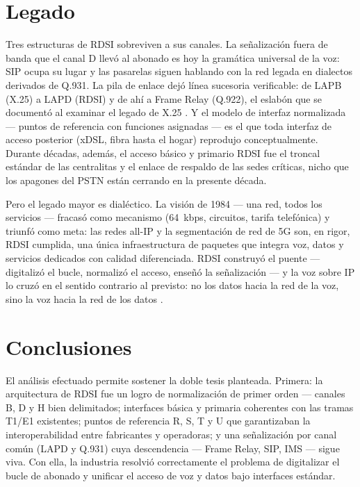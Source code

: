 \documentclass[12pt,a4paper]{article}
\begin{document}
\section{Legado}

Tres estructuras de RDSI sobreviven a sus canales. La señalización fuera de banda que el canal D llevó al abonado es hoy la gramática universal de la voz: SIP ocupa su lugar y las pasarelas siguen hablando con la red legada en dialectos derivados de Q.931. La pila de enlace dejó línea sucesoria verificable: de LAPB (X.25) a LAPD (RDSI) y de ahí a Frame Relay (Q.922), el eslabón que se documentó al examinar el legado de X.25 \cite{stallings2004, stallings1999}. Y el modelo de interfaz normalizada --- puntos de referencia con funciones asignadas --- es el que toda interfaz de acceso posterior (xDSL, fibra hasta el hogar) reprodujo conceptualmente. Durante décadas, además, el acceso básico y primario RDSI fue el troncal estándar de las centralitas y el enlace de respaldo de las sedes críticas, nicho que los apagones del PSTN están cerrando en la presente década.

Pero el legado mayor es dialéctico. La visión de 1984 --- una red, todos los servicios --- fracasó como mecanismo (64~kbps, circuitos, tarifa telefónica) y triunfó como meta: las redes all-IP y la segmentación de red de 5G son, en rigor, RDSI cumplida, una única infraestructura de paquetes que integra voz, datos y servicios dedicados con calidad diferenciada. RDSI construyó el puente --- digitalizó el bucle, normalizó el acceso, enseñó la señalización --- y la voz sobre IP lo cruzó en el sentido contrario al previsto: no los datos hacia la red de la voz, sino la voz hacia la red de los datos \cite{werbach2014}.

\section{Conclusiones}

El análisis efectuado permite sostener la doble tesis planteada. Primera: la arquitectura de RDSI fue un logro de normalización de primer orden --- canales B, D y H bien delimitados; interfaces básica y primaria coherentes con las tramas T1/E1 existentes; puntos de referencia R, S, T y U que garantizaban la interoperabilidad entre fabricantes y operadoras; y una señalización por canal común (LAPD y Q.931) cuya descendencia --- Frame Relay, SIP, IMS --- sigue viva. Con ella, la industria resolvió correctamente el problema de digitalizar el bucle de abonado y unificar el acceso de voz y datos bajo interfaces estándar.
\end{document}
